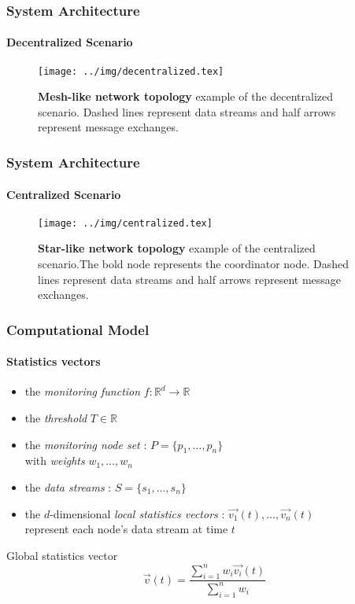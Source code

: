 \documentclass[hyperref={pdfpagelabels=false}]{beamer}
\begin{document}
\begin{frame} \frametitle{System Architecture} \framesubtitle{Decentralized Scenario}
\begin{figure}[H]
\centering
\vspace{-0.2cm}
\texttt{[image: ../img/decentralized.tex]}
\caption{\textbf{Mesh-like network topology} example of the decentralized scenario. Dashed lines represent data streams and half arrows represent message exchanges.} 
\end{figure}
\end{frame}

\begin{frame} \frametitle{System Architecture} \framesubtitle{Centralized Scenario}
\begin{figure}[H]
\centering
\vspace{-1cm}
\texttt{[image: ../img/centralized.tex]}
\caption{\textbf{Star-like network topology} example of the centralized scenario.The bold node represents the coordinator node. Dashed lines represent data streams and half arrows represent message exchanges.} 
\end{figure}
\end{frame}

\begin{frame} \frametitle{Computational Model}\framesubtitle{Statistics vectors}

\begin{itemize}
\item the \emph{monitoring function} $f:\mathbb{R}^d \to \mathbb{R}$
\item the \emph{threshold} $T \in \mathbb{R}$
\item the \emph{monitoring node set} : $P=\{p_1, \dots, p_n\}$\\\quad with \emph{weights} $w_1, \dots, w_n$
\item the \emph{data streams} : $S=\{s_1, \dots, s_n\}$
\item the $d$-dimensional \emph{local statistics vectors} : $\vec{v_1}(t), \dots, \vec{v_n}(t)$\\\quad represent each node's data stream at time $t$
\end{itemize}
\begin{block}{Global statistics vector}
\vspace{0.2cm}
\begin{equation}
\vec{v}(t)=\frac{\sum_{i=1}^n{w_i\vec{v_i}(t)}}{\sum_{i=1}^n{w_i}}
\label{form:globalStatsVector}
\end{equation}
\vspace{0.2cm}
\end{block}
\end{frame}
\end{document}
